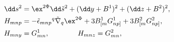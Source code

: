 \begin{equation}
\label{n=3} 
\begin{aligned}
   \dd s^2 &= \ex^{2\Phi}\dd \tilde s^2 
      +(\dd y+B^1)^2 + (\dd z+B^2)^2 , \\
   H_{mnp} &= -\tilde\epsilon_{mnp}{}^q\tilde{\nabla}_q \ex^{2\Phi}
      + 3B^1_{[m}G^1_{np]} + 3B^2_{[m}G^2_{np]} , \\
   H_{mny} &= G^1_{mn} , \qquad \qquad
   H_{mnz} = G^2_{mn} ,
\end{aligned}
\end{equation}

